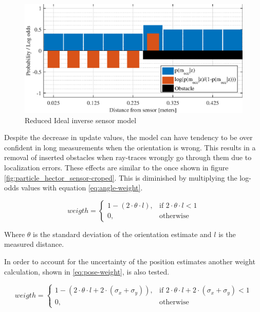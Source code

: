 \begin{figure}[htbp]
	\centering
	\includegraphics[scale=1]{figures/static_mapping/reduced_ideal_sensor_model}
	\caption{Reduced Ideal inverse sensor model}
	\label{fig:reduced_ideal_sensor_model}
\end{figure}

Despite the decrease in update values, the model can have tendency to be over confident in long measurements when the orientation is wrong.
This results in a removal of inserted obstacles when ray-traces wrongly go through them due to localization errors.
These effects are similar to the once shown in figure \ref{fig:particle_hector_sensor-croped}.
This is diminished by multiplying the log-odds values with equation \vref{eq:angle-weight}.

\begin{equation}
	\label{eq:angle-weight}
	weigth = 
	\begin{cases}
	1 - ( 2 \cdot \theta \cdot l ), & \text{if } 2 \cdot \theta \cdot l < 1\\
	0, & \text{otherwise}
	\end{cases}
\end{equation}

Where \(\theta \) is the standard deviation of the orientation estimate and \(l\) is the measured distance.

In order to account for the uncertainty of the position estimates another weight calculation, shown in \vref{eq:pose-weight}, is also tested.

\begin{equation}
\label{eq:pose-weight}
weigth = 
\begin{cases}
1 - ( 2 \cdot \theta \cdot l + 2 \cdot (\sigma_x + \sigma_y) ), & \text{if } 2 \cdot \theta \cdot l + 2 \cdot (\sigma_x + \sigma_y) < 1\\
0, & \text{otherwise}
\end{cases}
\end{equation}

